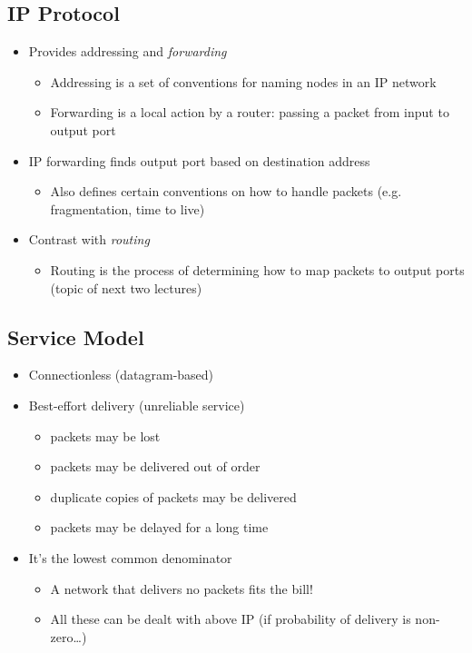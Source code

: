 \subsection{IP Protocol}
\begin{itemize}[nosep]
    \item Provides addressing and \emph{forwarding}
          \begin{itemize}[nosep]
              \item Addressing is a set of conventions for naming nodes in an IP network
              \item Forwarding is a local action by a router: passing a packet from input to output port
          \end{itemize}
    \item IP forwarding finds output port based on destination address
          \begin{itemize}[nosep]
              \item Also defines certain conventions on how to handle packets (e.g. fragmentation, time to live)
          \end{itemize}
    \item Contrast with \emph{routing}
          \begin{itemize}[nosep]
              \item Routing is the process of determining how to map packets to output ports (topic of next two lectures)
          \end{itemize}
\end{itemize}

\subsection{Service Model}
\begin{itemize}[nosep]
    \item Connectionless (datagram-based)
    \item Best-effort delivery (unreliable service)
          \begin{itemize}[nosep]
              \item packets may be lost
              \item packets may be delivered out of order
              \item duplicate copies of packets may be delivered
              \item packets may be delayed for a long time
          \end{itemize}
    \item It's the lowest common denominator
          \begin{itemize}[nosep]
              \item A network that delivers no packets fits the bill!
              \item All these can be dealt with above IP (if probability of delivery is non-zero\dots)
          \end{itemize}
\end{itemize}
